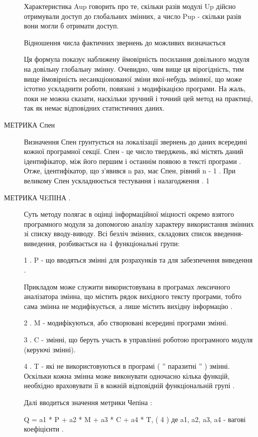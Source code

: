 \begin{description}
Характеристика Aup говорить про те, скільки разів модулі Up дійсно отримували доступ до глобальних змінних, а число Pup - скільки разів вони могли б отримати доступ.

Відношення числа фактичних звернень до можливих визначається



Ця формула показує наближену ймовірність посилання довільного модуля на довільну глобальну змінну. Очевидно, чим вище ця вірогідність, тим вище ймовірність несанкціонованої зміни якої-небудь змінної, що може істотно ускладнити роботи, пов\dq язані з модифікацією програми. На жаль, поки не можна сказати, наскільки зручний і точний цей метод на практиці, так як немає відповідних статистичних даних.

\item[{МЕТРИКА Спен}] \leavevmode
Визначення Спен грунтується на локалізації звернень до даних всередині кожної програмної секції. Спен - це число тверджень, які містять даний ідентифікатор, між його першим і останнім появою в тексті програми . Отже, ідентифікатор, що з'явився n раз, має Спен, рівний n - 1 . При великому Спен ускладнюється тестування і налагодження .
1

\item[{МЕТРИКА ЧEПІНА .}] \leavevmode
Суть методу полягає в оцінці інформаційної міцності окремо взятого програмного модуля за допомогою аналізу характеру використання змінних зі списку вводу-виводу.
Всі безліч змінних, складових список введення-виведення, розбивається на 4 функціональні групи:

1 . P - що вводяться змінні для розрахунків та для забезпечення виведення .

Прикладом може служити використовувана в програмах лексичного аналізатора змінна, що містить рядок вихідного тексту програми, тобто сама змінна не модифікується, а лише містить вихідну інформацію .

2 . M - модифікуються, або створювані всередині програми змінні.

3 . C - змінні, що беруть участь в управлінні роботою програмного модуля (керуючі змінні).

4 . T - які не використовуються в програмі ( '' паразитні '' ) змінні. Оскільки кожна змінна може виконувати одночасно кілька функцій, необхідно враховувати її в кожній відповідній функціональній групі .

Далі вводиться значення метрики Чепіна :

Q = a1 * P + a2 * M + a3 * C + a4 * T, ( 4 )
де a1, a2, a3, a4 - вагові коефіцієнти .


\end{description}
